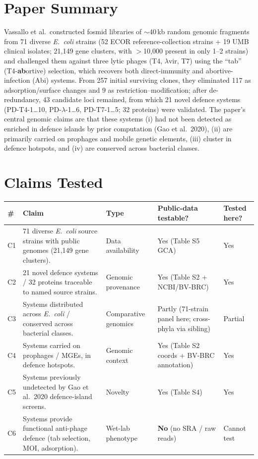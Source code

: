 \documentclass[11pt,letterpaper]{article}
\begin{document}
\section{Paper Summary}
Vassallo et al.\ constructed fosmid libraries of $\sim$40\,kb random genomic fragments from 71 diverse \textit{E.\ coli} strains (52 ECOR reference-collection strains + 19 UMB clinical isolates; 21{,}149 gene clusters, with $>$10{,}000 present in only 1--2 strains) and challenged them against three lytic phages (T4, $\lambda$vir, T7) using the ``tab'' (T4-\textbf{ab}ortive) selection, which recovers both direct-immunity and abortive-infection (Abi) systems. From 257 initial surviving clones, they eliminated 117 as adsorption/surface changes and 9 as restriction--modification; after de-redundancy, 43 candidate loci remained, from which 21 novel defence systems (PD-T4-1\ldots10, PD-$\lambda$-1\ldots6, PD-T7-1\ldots5; 32 proteins) were validated. The paper's central genomic claims are that these systems (i) had not been detected as enriched in defence islands by prior computation (Gao et al.\ 2020), (ii) are primarily carried on prophages and mobile genetic elements, (iii) cluster in defence hotspots, and (iv) are conserved across bacterial classes.

\section{Claims Tested}
\begin{longtable}{@{}p{0.5cm}p{7cm}p{2.5cm}p{2.5cm}p{2cm}@{}}
\toprule
\# & Claim & Type & Public-data testable? & Tested here? \\
\midrule
\endhead
C1 & 71 diverse \textit{E.\ coli} source strains with public genomes (21{,}149 gene clusters). & Data availability & Yes (Table S5 GCA) & Yes \\
C2 & 21 novel defence systems / 32 proteins traceable to named source strains. & Genomic provenance & Yes (Table S2 + NCBI/BV-BRC) & Yes \\
C3 & Systems distributed across \textit{E.\ coli} / conserved across bacterial classes. & Comparative genomics & Partly (71-strain panel here; cross-phyla via sibling) & Partial \\
C4 & Systems carried on prophages / MGEs, in defence hotspots. & Genomic context & Yes (Table S2 coords + BV-BRC annotation) & Yes \\
C5 & Systems previously undetected by Gao et al.\ 2020 defence-island screens. & Novelty & Yes (Table S4) & Yes \\
C6 & Systems provide functional anti-phage defence (tab selection, MOI, adsorption). & Wet-lab phenotype & \textbf{No} (no SRA / raw reads) & Cannot test \\
\bottomrule
\end{longtable}
\end{document}
